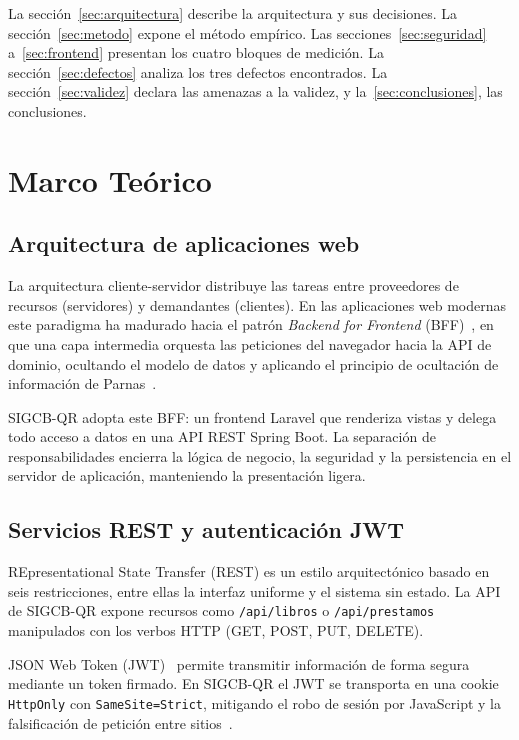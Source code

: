 \documentclass[11pt,a4paper]{article}
\begin{document}
La sección~\ref{sec:arquitectura} describe la arquitectura y sus decisiones. La
sección~\ref{sec:metodo} expone el método empírico. Las
secciones~\ref{sec:seguridad} a~\ref{sec:frontend} presentan los cuatro bloques de
medición. La sección~\ref{sec:defectos} analiza los tres defectos encontrados. La
sección~\ref{sec:validez} declara las amenazas a la validez, y
la~\ref{sec:conclusiones}, las conclusiones.

\section{Marco Teórico}\label{sec:marco}

\subsection{Arquitectura de aplicaciones web}

La arquitectura cliente-servidor distribuye las tareas entre proveedores de
recursos (servidores) y demandantes (clientes). En las aplicaciones web modernas
este paradigma ha madurado hacia el patrón \emph{Backend for Frontend}
(BFF)~\cite{newman2021building}, en que una capa intermedia orquesta las
peticiones del navegador hacia la API de dominio, ocultando el modelo de datos y
aplicando el principio de ocultación de información de
Parnas~\cite{parnas1972criteria}.

SIGCB-QR adopta este BFF: un frontend Laravel que renderiza vistas y delega todo
acceso a datos en una API REST Spring Boot. La separación de responsabilidades
encierra la lógica de negocio, la seguridad y la persistencia en el servidor de
aplicación, manteniendo la presentación ligera.

\subsection{Servicios REST y autenticación JWT}

REpresentational State Transfer (REST) es un estilo arquitectónico basado en seis
restricciones, entre ellas la interfaz uniforme y el sistema sin estado. La API de
SIGCB-QR expone recursos como \texttt{/api/libros} o \texttt{/api/prestamos}
manipulados con los verbos HTTP (GET, POST, PUT, DELETE).

JSON Web Token (JWT)~\cite{rfc7519} permite transmitir información de forma
segura mediante un token firmado. En SIGCB-QR el JWT se transporta en una cookie
\texttt{HttpOnly} con \texttt{SameSite=Strict}, mitigando el robo de sesión por
JavaScript y la falsificación de petición entre sitios~\cite{rfc6265bis}.
\end{document}
